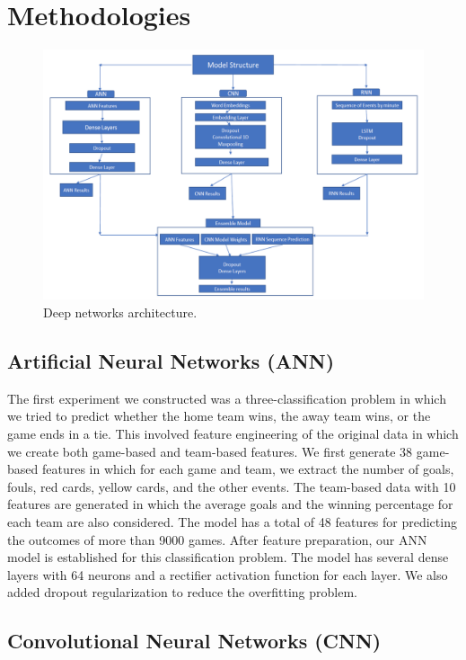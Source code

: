 \documentclass[11pt,a4paper]{article}
\begin{document}
\section{Methodologies}

\begin{figure}
\includegraphics[width=\textwidth]{./img/fig-1.png}
\caption{\label{model-figure} Deep networks architecture.}
\end{figure}

\subsection{Artificial Neural Networks (ANN)}

The first experiment we constructed was a three-classification problem in which we tried to predict whether the home team wins, the away team wins, or the game ends in a tie. This involved feature engineering of the original data in which we create both game-based and team-based features. We first generate 38 game-based features in which for each game and team, we extract the number of goals, fouls, red cards, yellow cards, and the other events. The team-based data with 10 features are generated in which the average goals and the winning percentage for each team are also considered. The model has a total of 48 features for predicting the outcomes of more than 9000 games. After feature preparation, our ANN model is established for this classification problem. The model has several dense layers with 64 neurons and a rectifier activation function for each layer. We also added dropout regularization to reduce the overfitting problem.

\subsection{Convolutional Neural Networks (CNN)}
\end{document}
